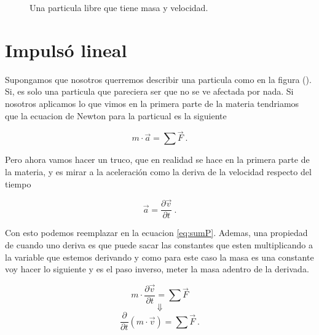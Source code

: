 \documentclass[../Main.tex]{subfiles}
\begin{document}
\begin{minipage}[t]{0.3\textwidth}
\begin{figure}[H]
    \centering
    \caption{Una particula libre que tiene masa y velocidad.}
    \label{fg:unaparticula}
\end{figure}

\end{minipage}
\hfill
\begin{minipage}[t]{0.6\textwidth}

\section{Impulsó lineal}

Supongamos que nosotros querremos describir una particula como en la 
figura (). Si, es solo una particula que pareciera ser que no se ve afectada
por nada. Si nosotros aplicamos lo que vimos en la primera parte de la materia
tendriamos que la ecuacion de Newton para la particual es la siguiente

\begin{equation}
    m \cdot \vec{a} = \sum \vec{F} \ .
\label{eq:sumP}
\end{equation}

Pero ahora vamos hacer un truco, que en realidad se hace en la primera parte de 
la materia, y es mirar a la aceleración como la deriva de la velocidad respecto
del tiempo

\begin{equation}
    \vec{a} = \frac{\partial \vec{v}}{\partial t} \ .
\end{equation}

Con esto podemos reemplazar en la ecuacion \ref{eq:sumP}. Ademas, una propiedad
de cuando uno deriva es que puede sacar las constantes que esten multiplicando
a la variable que estemos derivando y como para este caso la masa es una
constante voy hacer lo siguiente y es el paso inverso, meter la masa adentro de
la derivada.

\begin{equation}
    m \cdot \frac{\partial \vec{v}}{\partial t} = \sum \vec{F}
\end{equation}
\begin{equation*}
    \Downarrow
\end{equation*}
\begin{equation*}
    \frac{\partial}{\partial t} \left( m \cdot \vec{v} \right) = \sum \vec{F} \ .
\end{equation*}


\end{minipage}
\end{document}
